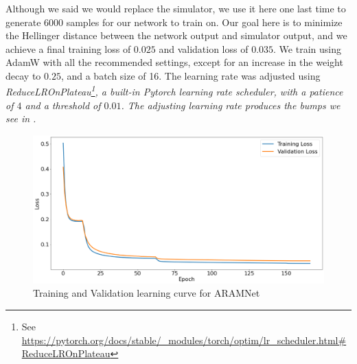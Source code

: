 Although we said we would replace the simulator, we use it here one last time to generate $6000$ samples for our network to train on.
Our goal here is to minimize the Hellinger distance between the network output and simulator output, and we achieve a final training loss of $0.025$ and validation loss of $0.035$.
We train using AdamW with all the recommended settings, except for an increase in the weight decay to $0.25$, and a batch size of 16.
The learning rate was adjusted using \it{ReduceLROnPlateau}\footnote{See \url{https://pytorch.org/docs/stable/_modules/torch/optim/lr_scheduler.html\#ReduceLROnPlateau}}, a built-in Pytorch learning rate scheduler, with a patience of $4$ and a threshold of $0.01$.
The adjusting learning rate produces the bumps we see in .

\begin{figure}[htbp]
    \centering
    \includegraphics[width=.9\textwidth]{figures/ARAMNet-loss.png}
    \caption{Training and Validation learning curve for ARAMNet}
    \label{Figure:ARAMNet-Learning-Curve} 
\end{figure}